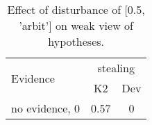 \begin{table}\begin{tabular}{l|cc}\toprule\multirow{2}{*}{Evidence} & \multicolumn{2}{c}{stealing}\\& {K2} & {Dev}\\\midrule
no evidence, 0 & \cellcolor{Bittersweet}0.57&\cellcolor{Bittersweet}0\\\bottomrule\end{tabular}\caption{Effect of disturbance of [0.5, 'arbit'] on weak view of hypotheses.}\end{table}